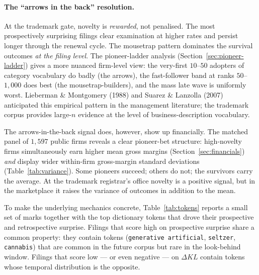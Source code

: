 \documentclass[11pt]{article}
\begin{document}
\paragraph{The ``arrows in the back'' resolution.}
At the trademark gate, novelty is \emph{rewarded}, not penalised.
The most prospectively surprising filings clear examination at higher
rates and persist longer through the renewal cycle. The mousetrap
pattern dominates the survival outcomes \emph{at the filing level}.
The pioneer-ladder analysis (Section~\ref{sec:pioneer-ladder}) gives
a more nuanced firm-level view: the very-first $10$--$50$ adopters
of category vocabulary do badly (the arrows), the fast-follower band
at ranks $50$--$1{,}000$ does best (the mousetrap-builders), and the
mass late wave is uniformly worst. Lieberman \& Montgomery (1988)
and Suarez \& Lanzolla (2007) anticipated this empirical pattern in
the management literature; the trademark corpus provides large-$n$
evidence at the level of business-description vocabulary.

The arrows-in-the-back signal does, however, show up financially. The
matched panel of $1{,}597$ public firms reveals a clear pioneer-bet
structure: high-novelty firms simultaneously earn higher mean gross
margins (Section~\ref{sec:financials}) \emph{and} display wider
within-firm gross-margin standard deviations (Table~\ref{tab:variance}).
Some pioneers succeed; others do not; the survivors carry the average.
At the trademark registrar's office novelty is a positive signal, but
in the marketplace it raises the variance of outcomes in addition to
the mean.

To make the underlying mechanics concrete,
Table~\ref{tab:tokens} reports a small set of marks together with the
top dictionary tokens that drove their prospective and retrospective
surprise. Filings that score high on prospective surprise share a common
property: they contain tokens (\texttt{generative artificial},
\texttt{seltzer}, \texttt{cannabis}) that are common in the future
corpus but rare in the look-behind window. Filings that score low ---
or even negative --- on $\Delta KL$ contain tokens whose temporal
distribution is the opposite.
\end{document}

